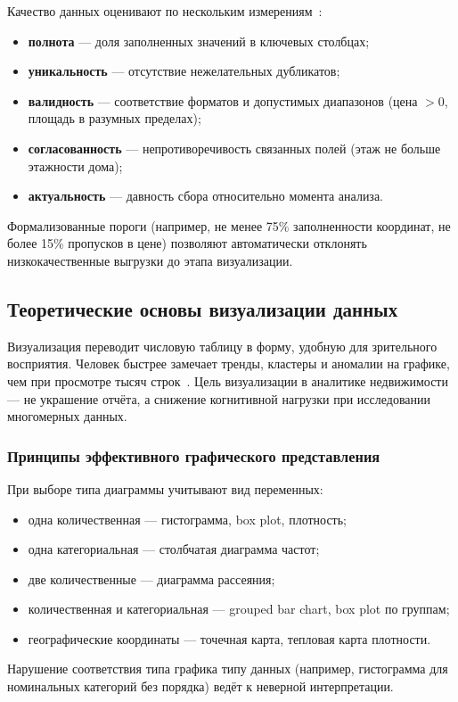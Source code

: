 Качество данных оценивают по нескольким измерениям~\cite{demidova2022}:
\begin{itemize}
    \item \textbf{полнота} --- доля заполненных значений в ключевых столбцах;
    \item \textbf{уникальность} --- отсутствие нежелательных дубликатов;
    \item \textbf{валидность} --- соответствие форматов и допустимых диапазонов (цена ${>}0$, площадь в разумных пределах);
    \item \textbf{согласованность} --- непротиворечивость связанных полей (этаж не больше этажности дома);
    \item \textbf{актуальность} --- давность сбора относительно момента анализа.
\end{itemize}
Формализованные пороги (например, не менее 75\% заполненности координат, не более 15\% пропусков в цене) позволяют автоматически отклонять низкокачественные выгрузки до этапа визуализации.

\subsection{Теоретические основы визуализации данных}

Визуализация переводит числовую таблицу в форму, удобную для зрительного восприятия. Человек быстрее замечает тренды, кластеры и аномалии на графике, чем при просмотре тысяч строк~\cite{vanderplas2023}. Цель визуализации в аналитике недвижимости --- не украшение отчёта, а снижение когнитивной нагрузки при исследовании многомерных данных.

\subsubsection{Принципы эффективного графического представления}

При выборе типа диаграммы учитывают вид переменных:
\begin{itemize}
    \item одна количественная --- гистограмма, box plot, плотность;
    \item одна категориальная --- столбчатая диаграмма частот;
    \item две количественные --- диаграмма рассеяния;
    \item количественная и категориальная --- grouped bar chart, box plot по группам;
    \item географические координаты --- точечная карта, тепловая карта плотности.
\end{itemize}
Нарушение соответствия типа графика типу данных (например, гистограмма для номинальных категорий без порядка) ведёт к неверной интерпретации.

